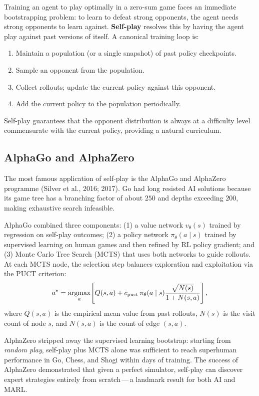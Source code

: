 Training an agent to play optimally in a zero-sum game faces an
immediate bootstrapping problem: to learn to defeat strong opponents,
the agent needs strong opponents to learn against. \textbf{Self-play}
 resolves this by having the agent play against
past versions of itself. A canonical training loop is:
\begin{enumerate}[leftmargin=*]
  \item Maintain a population (or a single snapshot) of past policy
    checkpoints.
  \item Sample an opponent from the population.
  \item Collect rollouts; update the current policy against this
    opponent.
  \item Add the current policy to the population periodically.
\end{enumerate}
Self-play guarantees that the opponent distribution is always at a
difficulty level commensurate with the current policy, providing a
natural curriculum.

\subsection{AlphaGo and AlphaZero}

The most famous application of self-play is the AlphaGo and
AlphaZero programme (Silver et al., 2016;
2017). Go had long resisted AI solutions because its
game tree has a branching factor of about $250$ and depths exceeding
$200$, making exhaustive search infeasible.

AlphaGo combined three components: (1) a value network $v_\theta(s)$
trained by regression on self-play outcomes; (2) a policy network
$\pi_\theta(a \mid s)$ trained by supervised learning on human games
and then refined by RL policy gradient; and (3) Monte Carlo Tree
Search (MCTS) that uses both networks to guide rollouts.
At each MCTS node, the selection step balances exploration and
exploitation via the PUCT criterion:
\begin{equation}
\label{eq:puct}
a^* = \operatorname*{argmax}_{a}\!\left[
  Q(s, a) + c_\mathrm{puct}\, \pi_\theta(a \mid s)
  \frac{\sqrt{N(s)}}{1 + N(s, a)}
\right],
\end{equation}
where $Q(s,a)$ is the empirical mean value from past rollouts,
$N(s)$ is the visit count of node $s$, and $N(s,a)$ is the count
of edge $(s,a)$.

AlphaZero stripped away the supervised learning
bootstrap: starting from \emph{random play}, self-play plus MCTS
alone was sufficient to reach superhuman performance in Go, Chess,
and Shogi within days of training. The success of AlphaZero
demonstrated that given a perfect simulator, self-play can discover
expert strategies entirely from scratch\,---\,a landmark result for
both AI and MARL.

